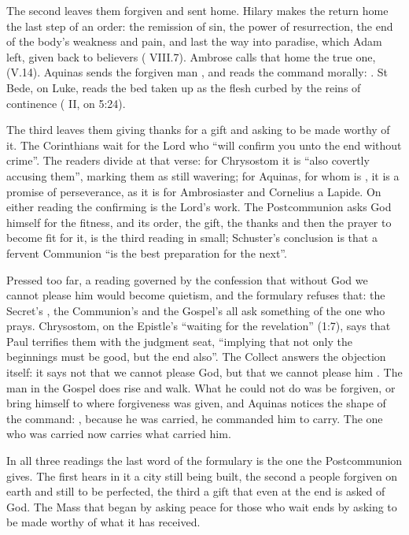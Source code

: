 The second leaves them forgiven and sent home. Hilary makes the return home the
last step of an order: the remission of sin, the power of resurrection, the end
of the body's weakness and pain, and last the way into paradise, which Adam
left, given back to believers ( VIII.7). Ambrose
calls that home the true one,  (V.14). Aquinas sends the forgiven man , and reads the command morally:
.
St Bede, on Luke, reads the bed taken up as the flesh curbed by the reins of
continence ( II, on 5:24).

The third leaves them giving thanks for a gift and asking to be made worthy of
it. The Corinthians wait for the Lord who ``will confirm you unto the end
without crime''. The readers divide at that verse: for Chrysostom it is ``also
covertly accusing them'', marking them as still wavering; for Aquinas, for
whom  is , it is a promise of
perseverance, as it is for Ambrosiaster and Cornelius a Lapide. On either reading the confirming is
the Lord's work. The Postcommunion asks God himself for the fitness, and its
order, the gift, the thanks and then the prayer to become fit for it, is the
third reading in small; Schuster's conclusion is that a fervent Communion ``is
the best preparation for the next''.

Pressed too far, a reading governed by the confession that without God we
cannot please him would become quietism, and the formulary refuses that: the Secret's , the Communion's
 and the Gospel's  all ask something of the one who prays. Chrysostom, on
the Epistle's ``waiting for the revelation'' (1:7), says that Paul terrifies
them with the judgment seat, ``implying that not only the beginnings must be
good, but the end also''. The Collect answers the objection itself: it says not
that we cannot please God, but that we cannot please him . The
man in the Gospel does rise and walk. What he could not do was be forgiven, or
bring himself to where forgiveness was given, and Aquinas notices the shape of
the command: , because he was
carried, he commanded him to carry. The one who was carried now carries what
carried him.

In all three readings the last word of the formulary is the one the
Postcommunion gives. The first hears in it a city still being built, the second
a people forgiven on earth and still to be perfected, the third a gift that
even at the end is asked of God. The Mass that began by asking peace for those
who wait ends by asking to be made worthy of what it has received.
